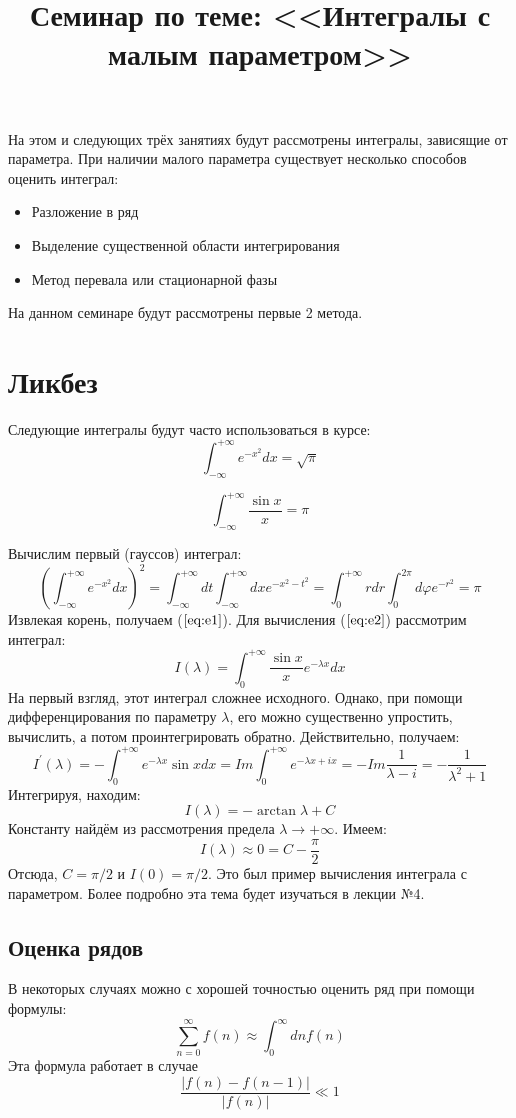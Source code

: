 \documentclass[a4paper,12pt]{article}
\begin{document}
\title{Семинар по теме: <<Интегралы с малым параметром>>}

\maketitle
На этом и следующих трёх занятиях будут рассмотрены интегралы, зависящие от параметра. При наличии малого параметра существует несколько способов оценить интеграл:
\begin{itemize}
	\item Разложение в ряд
	\item Выделение существенной области интегрирования
	\item Метод перевала или стационарной фазы
\end{itemize}
На данном семинаре будут рассмотрены первые 2 метода.
\section{Ликбез}
Следующие интегралы будут часто использоваться в курсе:
\begin{equation}\label{eq:e1}
\int_{-\infty}^{+\infty} e^{-x^2} dx= \sqrt{\pi}
\end{equation}

\begin{equation}\label{eq:e2}
\int_{-\infty}^{+\infty} \frac{\sin x}{x}=\pi
\end{equation}

Вычислим первый (гауссов) интеграл:
$$
\left(\int_{-\infty}^{+\infty} e^{-x^2} dx\right)^2=\int_{-\infty}^{+\infty} dt \int_{-\infty}^{+\infty} dx e^{-x^2-t^2}=\int_{0}^{+\infty} r dr \int_{0}^{2\pi} d\varphi e^{-r^2}=\pi
$$
Извлекая корень, получаем ($\ref{eq:e1}$). Для вычисления ($\ref{eq:e2}$) рассмотрим интеграл:
$$
I(\lambda)=\int_{0}^{+\infty}\frac{\sin x}{x}e^{-\lambda x} dx
$$
На первый взгляд, этот интеграл сложнее исходного. Однако, при помощи дифференцирования по параметру $\lambda$, его можно существенно упростить, вычислить, а потом проинтегрировать обратно. Действительно, получаем:
$$
I^{'}(\lambda)=-\int_{0}^{+\infty}e^{-\lambda x}\sin x dx=Im\int_{0}^{+\infty}e^{-\lambda x+ix}=-Im\frac{1}{\lambda-i}=-\frac{1}{\lambda^2+1}
$$
Интегрируя, находим:
$$
I(\lambda)=-\arctan\lambda+C
$$
Константу найдём из рассмотрения предела $\lambda\to+\infty$. Имеем:
$$
I(\lambda)\approx0=C-\frac{\pi}{2}
$$
Отсюда, $C=\pi/2$ и $I(0)=\pi/2$.
Это был пример вычисления интеграла с параметром. Более подробно эта тема будет изучаться в лекции №4.

\subsection{Оценка рядов}
В некоторых случаях можно с хорошей точностью оценить ряд при помощи формулы:
$$
\sum_{n=0}^{\infty} f(n)\approx\int_{0}^{\infty} dn f(n)
$$
Эта формула работает в случае
$$
\frac{|f(n)-f(n-1)|}{|f(n)|}\ll1
$$
\end{document}
